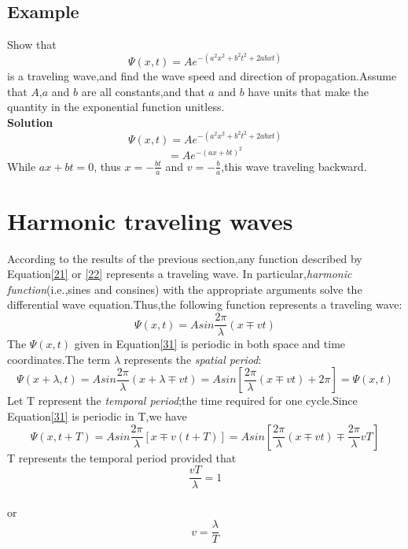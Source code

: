 \documentclass[12pt]{article}
\numberwithin{equation}{section}
\begin{document}
\subsection{Example}
    Show that\\
    \[
    \Psi(x,t)=Ae^{-(a^2x^2+b^2t^2+2abxt)}
    \]
    is a traveling wave,and find the wave speed and direction of propagation.Assume that $A$,$a$ and $b$ are all constants,and that $a$ and $b$ have units that make the quantity in the exponential function unitless.\\
    \indent \textbf{Solution}\\
    \[
    \Psi(x,t)=Ae^{-(a^2x^2+b^2t^2+2abxt)}
    \]
    \[
    =Ae^{-(ax+bt)^2}
    \]
    \indent While $ax+bt=0$, thus $x=-\frac{bt}{a}$ and $v=-\frac{b}{a}$,this wave traveling backward.
\section{Harmonic traveling waves}
    According to the results of the previous section,any function described by Equation\eqref{21} or \eqref{22} represents a 
    traveling wave. In particular,\emph{harmonic function}(i.e.,sines and consines) with the appropriate arguments solve the differential wave equation.Thus,the following function represents a traveling wave:
    \\
    \begin{equation}
        \Psi(x,t)=Asin\frac{2\pi}{\lambda}(x\mp vt)\label{31}
    \end{equation}
    The $\Psi(x,t)$ given in Equation\eqref{31} is periodic in both space and time coordinates.The term $\lambda$ represents the \emph{spatial period}:
    \[
    \Psi(x+\lambda ,t)=Asin\frac{2\pi}{\lambda}(x+\lambda \mp vt)=Asin[\frac{2\pi}{\lambda}(x\mp vt)+2\pi]=\Psi(x,t) 
    \]
    Let T represent the \emph{temporal period};the time required for one cycle.Since Equation\eqref{31} is periodic in T,we have
    \[
    \Psi(x,t+T)=Asin\frac{2\pi}{\lambda}[x\mp v(t+T)]=Asin[\frac{2\pi}{\lambda}(x\mp vt)\mp \frac{2\pi}{\lambda}vT]
    \]
    T represents the temporal period provided that
    \\
    \begin{equation}
        \frac{vT}{\lambda}=1\label{32}
    \end{equation}
    \\
    or 
    \\
    \begin{equation}
        v=\frac{\lambda}{T}\label{33}
    \end{equation}
\end{document}
